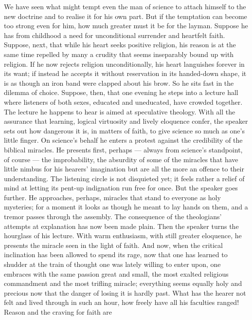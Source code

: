\documentclass[12pt,a4paper]{book}
\newcommand{\opage}[1]{\marginnote{\footnotesize\textit{[#1]}}}
\begin{document}
We have seen what might tempt even the man of science to attach himself to the
new doctrine and to realise it for his own part. But if the temptation can
become too strong even for him, how much greater must it be for the layman.
Suppose he has from childhood a need for unconditional surrender and heartfelt
faith. Suppose, next, that while his heart seeks positive religion, his reason
is at the same time repelled by many a crudity that seems inseparably bound up
with religion. If he now rejects religion unconditionally, his heart languishes
forever in its want; if instead he accepts it without reservation in its
handed-down shape, it is as though an iron band were clapped about his brow. So
he sits fast in the dilemma of choice. Suppose, then, that one evening he steps
into a lecture hall where listeners of both sexes, educated and uneducated,
have crowded together. The lecture he happens to hear is aimed at speculative
theology. With all the assurance that learning, logical virtuosity and lively
eloquence confer, the speaker sets out
\opage{16}how dangerous it is, in matters of faith, to give science so much as
one's little finger. On science's behalf he enters a protest against the
credibility of the biblical miracles. He presents first, perhaps --- always
from science's standpoint, of course --- the improbability, the absurdity of
some of the miracles that have little nimbus for his hearers' imagination but
are all the more an offence to their understanding. The listening circle is not
disquieted yet; it feels rather a relief of mind at letting its pent-up
indignation run free for once. But the speaker goes further. He approaches,
perhaps, miracles that stand to everyone as holy mysteries; for a moment it
looks as though he meant to lay hands on them, and a tremor passes through the
assembly. The consequence of the theologians' attempts at explanation has now
been made plain. Then the speaker turns the hourglass of his lecture. With warm
enthusiasm, with still greater eloquence, he presents the miracle seen in the
light of faith. And now, when the critical inclination has been allowed to
spend its rage, now that one has learned to shudder at the train of thought one
was lately willing to enter upon, one embraces with the same passion great and
small, the most exalted religious commandment and the most trifling miracle;
everything seems equally holy and precious now that the danger of losing it is
hardly past. What has the hearer not felt and lived through in such an hour,
how freely have all his faculties ranged! Reason and the craving for faith are
\end{document}
